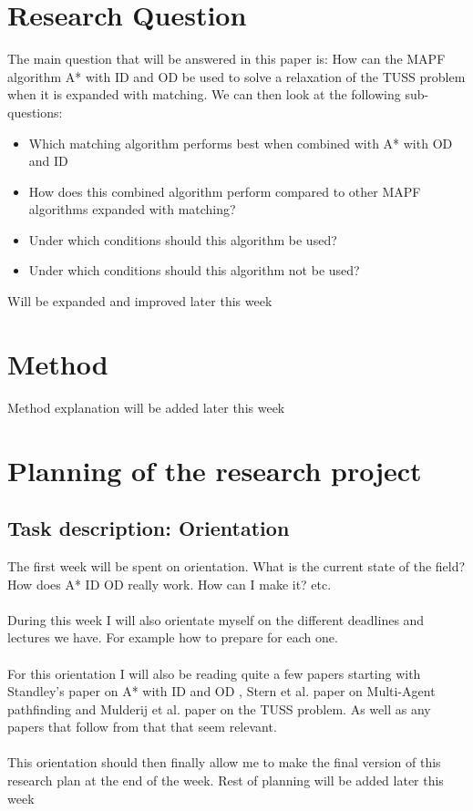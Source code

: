 \documentclass[english]{article}
\begin{document}
\section*{Research Question}
The main question that will be answered in this paper is: How can the MAPF algorithm A* with ID and OD be used to solve a relaxation of the TUSS problem when it is expanded with matching. We can then look at the following sub-questions:
\begin{itemize}
	\item Which matching algorithm performs best when combined with A* with OD and ID
	\item How does this combined algorithm perform compared to other MAPF algorithms expanded with matching?
	\item Under which conditions should this algorithm be used?
	\item Under which conditions should this algorithm not be used?
\end{itemize}
{\color{red}Will be expanded and improved later this week}

\section*{Method}
{\color{red}Method explanation will be added later this week}

\section*{Planning of the research project}
\subsection*{Task description: Orientation}
The first week will be spent on orientation. What is the current state of the field?  How does A* ID OD really work. How can I make it? etc.
\\\\
During this week I will also orientate myself on the different deadlines and lectures we have. For example how to prepare for each one.
\\\\
For this orientation I will also be reading quite a few papers starting with Standley's paper on A* with ID and OD \cite{AStarIDOD_standley_2010}, Stern et al. paper on Multi-Agent pathfinding\cite{stern2019multiagent} and Mulderij et al. paper on the TUSS problem\cite{mulderij2020train}. As well as any papers that follow from that that seem relevant.
\\\\
This orientation should then finally allow me to make the final version of this research plan at the end of the week.
{\color{red}Rest of planning will be added later this week}
\end{document}

